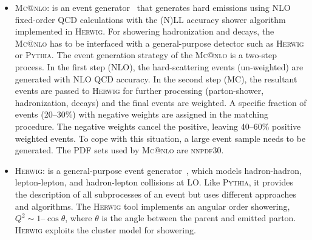 \begin{itemize}
\item{\textsc{Mc@nlo:}} is an event generator~\cite{mcanlo} that generates hard emissions using NLO fixed-order QCD calculations with the (N)LL accuracy shower algorithm implemented in \textsc{Herwig}. For showering hadronization and decays, the \textsc{Mc@nlo} has to be interfaced with a general-purpose detector such as \textsc{Herwig} or \textsc{Pythia}. The event generation strategy of the \textsc{Mc@nlo} is a two-step process. In the first step (NLO), the hard-scattering events (un-weighted) are generated with NLO QCD accuracy. In the second step (MC), the resultant events are passed to \textsc{Herwig} for further processing (parton-shower, hadronization, decays) and the final events are weighted. A specific fraction of events (20–30\%) with negative weights are assigned in the matching procedure. The negative weights cancel the positive, leaving 40–60\% positive weighted events. To cope with this situation, a large event sample needs to be generated. The PDF sets used by \textsc{Mc@nlo} are \textsc{nnpdf30}.

\item{\textsc{Herwig:}}\label{subsec:herwig} is a general-purpose event generator~\cite{herwig}, which models hadron-hadron, lepton-lepton, and hadron-lepton collisions at LO. Like \textsc{Pythia}, it provides the description of all subprocesses of an event but uses different approaches and algorithms. The \textsc{Herwig} tool implements an angular order showering, $Q^{2} \sim 1 – \cos\theta$, where $\theta$ is the angle between the parent and emitted parton. \textsc{Herwig} exploits the cluster model for showering.
\end{itemize}
